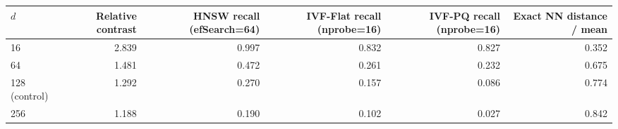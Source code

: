 \begin{tabular}{lrrrrr}
\toprule
$d$ & Relative contrast & HNSW recall (efSearch=64) & IVF-Flat recall (nprobe=16) & IVF-PQ recall (nprobe=16) & Exact NN distance / mean \\
\midrule
16 & 2.839 & 0.997 & 0.832 & 0.827 & 0.352 \\
64 & 1.481 & 0.472 & 0.261 & 0.232 & 0.675 \\
128 (control) & 1.292 & 0.270 & 0.157 & 0.086 & 0.774 \\
256 & 1.188 & 0.190 & 0.102 & 0.027 & 0.842 \\
\bottomrule
\end{tabular}
